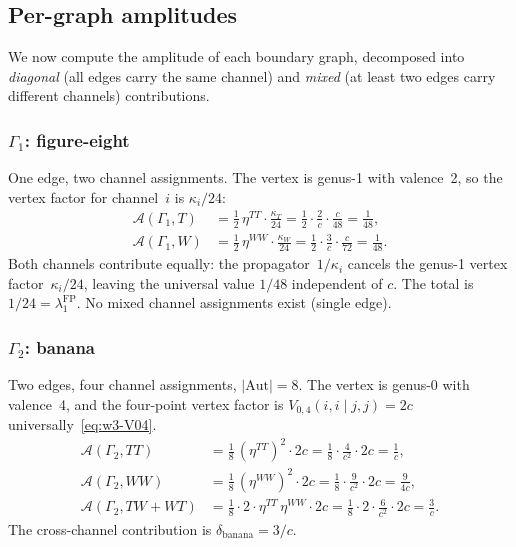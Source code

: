 \subsection{Per-graph amplitudes}
\label{subsec:per-graph-amplitudes}

We now compute the amplitude of each boundary graph, decomposed into
\emph{diagonal} (all edges carry the same channel) and \emph{mixed}
(at least two edges carry different channels) contributions.

\subsubsection*{$\Gamma_1$: figure-eight}

One edge, two channel assignments. The vertex is genus-1 with
valence~2, so the vertex factor for channel~$i$ is $\kappa_i/24$:
\begin{align}
\mathcal{A}(\Gamma_1, T) &= \tfrac{1}{2}\, \eta^{TT} \cdot
 \tfrac{\kappa_T}{24}
 = \tfrac{1}{2} \cdot \tfrac{2}{c} \cdot \tfrac{c}{48}
 = \tfrac{1}{48}, \label{eq:fig-eight-T}\\
\mathcal{A}(\Gamma_1, W) &= \tfrac{1}{2}\, \eta^{WW} \cdot
 \tfrac{\kappa_W}{24}
 = \tfrac{1}{2} \cdot \tfrac{3}{c} \cdot \tfrac{c}{72}
 = \tfrac{1}{48}. \label{eq:fig-eight-W}
\end{align}
Both channels contribute equally: the propagator~$1/\kappa_i$ cancels
the genus-1 vertex factor~$\kappa_i/24$, leaving the universal value
$1/48$ independent of $c$. The total is $1/24 = \lambda_1^{\mathrm{FP}}$.
No mixed channel assignments exist (single edge).

\subsubsection*{$\Gamma_2$: banana}

Two edges, four channel assignments, $|\mathrm{Aut}| = 8$. The
vertex is genus-0 with valence~4, and the four-point vertex factor
is $V_{0,4}(i,i \mid j,j) = 2c$ universally~\eqref{eq:w3-V04}.
\begin{align}
\mathcal{A}(\Gamma_2, TT) &=
 \tfrac{1}{8}\, (\eta^{TT})^2 \cdot 2c
 = \tfrac{1}{8} \cdot \tfrac{4}{c^2} \cdot 2c
 = \frac{1}{c}, \label{eq:banana-TT}\\
\mathcal{A}(\Gamma_2, WW) &=
 \tfrac{1}{8}\, (\eta^{WW})^2 \cdot 2c
 = \tfrac{1}{8} \cdot \tfrac{9}{c^2} \cdot 2c
 = \frac{9}{4c}, \label{eq:banana-WW}\\
\mathcal{A}(\Gamma_2, TW{+}WT) &=
 \tfrac{1}{8} \cdot 2 \cdot \eta^{TT}\, \eta^{WW} \cdot 2c
 = \tfrac{1}{8} \cdot 2 \cdot \tfrac{6}{c^2} \cdot 2c
 = \frac{3}{c}. \label{eq:banana-mixed}
\end{align}
The cross-channel contribution is $\delta_{\mathrm{banana}} = 3/c$.

